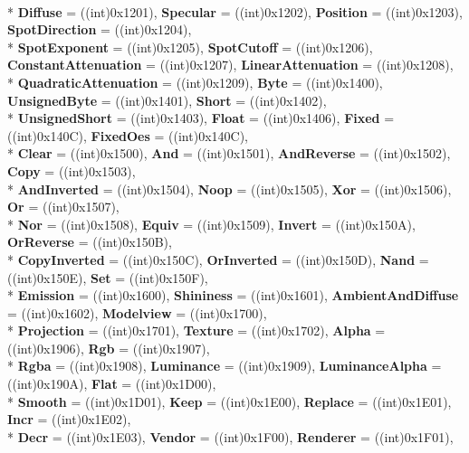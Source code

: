 \begin{DoxyCompactItemize}
\\*
{\bfseries Diffuse} = ((int)0x1201), 
{\bfseries Specular} = ((int)0x1202), 
{\bfseries Position} = ((int)0x1203), 
{\bfseries Spot\-Direction} = ((int)0x1204), 
\\*
{\bfseries Spot\-Exponent} = ((int)0x1205), 
{\bfseries Spot\-Cutoff} = ((int)0x1206), 
{\bfseries Constant\-Attenuation} = ((int)0x1207), 
{\bfseries Linear\-Attenuation} = ((int)0x1208), 
\\*
{\bfseries Quadratic\-Attenuation} = ((int)0x1209), 
{\bfseries Byte} = ((int)0x1400), 
{\bfseries Unsigned\-Byte} = ((int)0x1401), 
{\bfseries Short} = ((int)0x1402), 
\\*
{\bfseries Unsigned\-Short} = ((int)0x1403), 
{\bfseries Float} = ((int)0x1406), 
{\bfseries Fixed} = ((int)0x140\-C), 
{\bfseries Fixed\-Oes} = ((int)0x140\-C), 
\\*
{\bfseries Clear} = ((int)0x1500), 
{\bfseries And} = ((int)0x1501), 
{\bfseries And\-Reverse} = ((int)0x1502), 
{\bfseries Copy} = ((int)0x1503), 
\\*
{\bfseries And\-Inverted} = ((int)0x1504), 
{\bfseries Noop} = ((int)0x1505), 
{\bfseries Xor} = ((int)0x1506), 
{\bfseries Or} = ((int)0x1507), 
\\*
{\bfseries Nor} = ((int)0x1508), 
{\bfseries Equiv} = ((int)0x1509), 
{\bfseries Invert} = ((int)0x150\-A), 
{\bfseries Or\-Reverse} = ((int)0x150\-B), 
\\*
{\bfseries Copy\-Inverted} = ((int)0x150\-C), 
{\bfseries Or\-Inverted} = ((int)0x150\-D), 
{\bfseries Nand} = ((int)0x150\-E), 
{\bfseries Set} = ((int)0x150\-F), 
\\*
{\bfseries Emission} = ((int)0x1600), 
{\bfseries Shininess} = ((int)0x1601), 
{\bfseries Ambient\-And\-Diffuse} = ((int)0x1602), 
{\bfseries Modelview} = ((int)0x1700), 
\\*
{\bfseries Projection} = ((int)0x1701), 
{\bfseries Texture} = ((int)0x1702), 
{\bfseries Alpha} = ((int)0x1906), 
{\bfseries Rgb} = ((int)0x1907), 
\\*
{\bfseries Rgba} = ((int)0x1908), 
{\bfseries Luminance} = ((int)0x1909), 
{\bfseries Luminance\-Alpha} = ((int)0x190\-A), 
{\bfseries Flat} = ((int)0x1\-D00), 
\\*
{\bfseries Smooth} = ((int)0x1\-D01), 
{\bfseries Keep} = ((int)0x1\-E00), 
{\bfseries Replace} = ((int)0x1\-E01), 
{\bfseries Incr} = ((int)0x1\-E02), 
\\*
{\bfseries Decr} = ((int)0x1\-E03), 
{\bfseries Vendor} = ((int)0x1\-F00), 
{\bfseries Renderer} = ((int)0x1\-F01), 

\end{DoxyCompactItemize}
